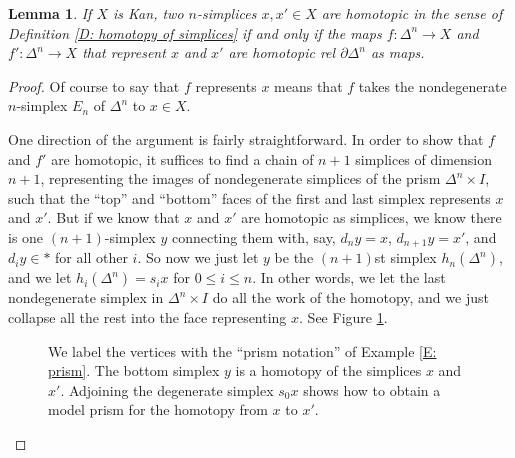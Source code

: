 \documentclass[12pt]{article}
\theoremstyle{plain}
\newtheorem{lemma}[theorem]{Lemma}
\theoremstyle{definition}
\newcommand{\bd}{\partial}
\begin{document}
\begin{lemma}\label{L: equiv. of homotopies}
If $X$ is Kan, two $n$-simplices $x,x'\in X$ are homotopic in the sense of Definition \ref{D: homotopy of simplices} if and only if the  maps $f\colon \Delta^n \to X$ and $f'\colon \Delta^n\to X$ that represent $x$ and $x'$ are homotopic rel $\bd \Delta^n$ as maps. 
\end{lemma}
\begin{proof}
Of course to say that $f$ represents $x$ means that $f$ takes the nondegenerate $n$-simplex $E_n$ of $\Delta^n$ to $x\in X$. 

One direction of the argument is fairly straightforward. In order to show that $f$ and $f'$ are homotopic, it suffices to find a chain of $n+1$ simplices of dimension $n+1$, representing the images of nondegenerate simplices of the prism $\Delta^n\times I$, such that the ``top'' and ``bottom'' faces of the first and last simplex represents $x$ and $x'$. But if we know that $x$ and $x'$ are homotopic as simplices, we know there is one $(n+1)$-simplex $y$ connecting them with, say, $d_ny=x$, $d_{n+1}y=x'$, and $d_iy\in *$ for all other $i$. So now we just let $y$ be the $(n+1)$st simplex $h_n(\Delta^n)$, and we let $h_i(\Delta^n)=s_ix$ for $0\leq i\leq n$. In other words, we let the last nondegenerate simplex in $\Delta^n\times I$ do all the work of the homotopy, and we just collapse all the rest into the face representing $x$. See Figure \ref{F: fig24}. 

\begin{figure}[!htp]
\begin{center}
\end{center}
\caption{We label the vertices with the ``prism notation'' of Example \ref{E: prism}. The bottom simplex $y$ is a homotopy of the simplices $x$ and $x'$. Adjoining the degenerate simplex $s_0x$ shows how to obtain a model prism for  the homotopy from $x$ to $x'$.}\label{F: fig24}
\end{figure}


\end{proof}
\end{document}
